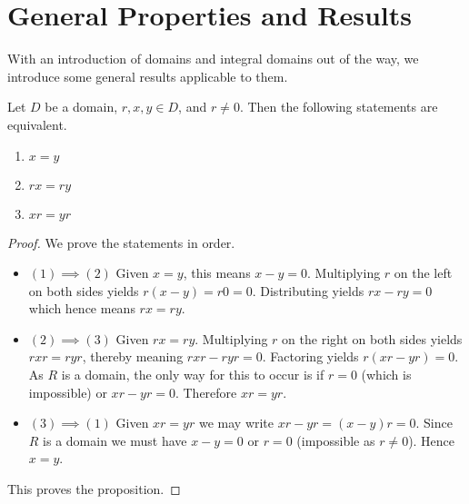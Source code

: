 \section{General Properties and Results}
With an introduction of domains and integral domains out of the way, we introduce some general results applicable to them.
\begin{proposition}\label{prop-domain-cancellation-law}
    Let $D$ be a domain, $r, x, y \in D$, and $r \neq 0$. Then the following statements are equivalent.
    \begin{enumerate}[label=(\arabic*)]
        \item $x = y$
        \item $rx = ry$
        \item $xr = yr$
    \end{enumerate}
\end{proposition}
\begin{proof}
    We prove the statements in order.
    \begin{itemize}
        \item $\boxed{(1) \implies (2)}$ Given $x = y$, this means $x - y = 0$. Multiplying $r$ on the left on both sides yields $r(x-y) = r0 = 0$. Distributing yields $rx - ry = 0$ which hence means $rx = ry$.

        \item $\boxed{(2) \implies (3)}$ Given $rx = ry$. Multiplying $r$ on the right on both sides yields $rxr = ryr$, thereby meaning $rxr - ryr = 0$. Factoring yields $r(xr - yr) = 0$. As $R$ is a domain, the only way for this to occur is if $r = 0$ (which is impossible) or $xr - yr = 0$. Therefore $xr = yr$.

        \item $\boxed{(3) \implies (1)}$ Given $xr = yr$ we may write $xr - yr = (x-y)r = 0$. Since $R$ is a domain we must have $x - y = 0$ or $r = 0$ (impossible as $r \neq 0$). Hence $x = y$.
    \end{itemize}
    This proves the proposition.
\end{proof}

